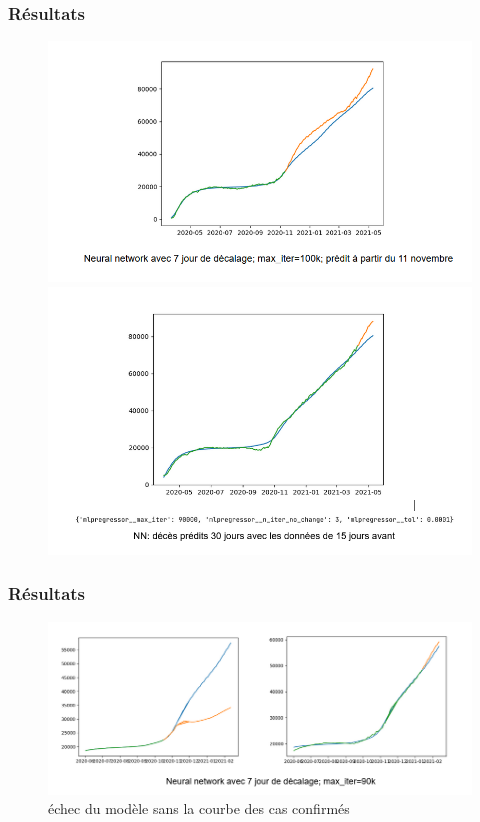 \documentclass{beamer}
\begin{document}
\begin{frame}
	\frametitle{Résultats}
	\begin{figure}[h]
		\centering
		\begin{minipage}{0.5\textwidth}
			\includegraphics[width=\textwidth]{NN_1}
			\centering
		\end{minipage}
		\begin{minipage}{0.5\textwidth}
			\includegraphics[width=\textwidth]{NN_2}
			\centering
		\end{minipage}
	\end{figure}
\end{frame}

\begin{frame}
	\frametitle{Résultats}
	\begin{figure}
		\includegraphics[scale=0.6]{NN_3}
		\caption{échec du modèle sans la courbe des cas confirmés}
	\end{figure}
\end{frame}
\end{document}
